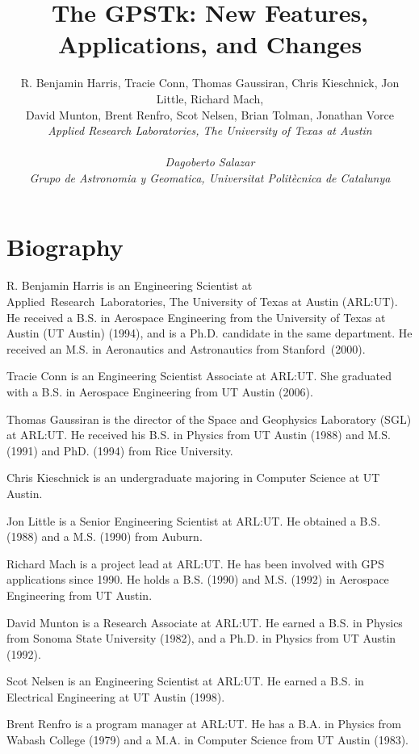 \documentclass[letterpaper,ugly,10pt]{ion-gps}
\title{\huge\bf The GPSTk: New Features, Applications, and Changes }
\author{ R. Benjamin Harris, Tracie Conn, Thomas Gaussiran, 
Chris Kieschnick, Jon Little, Richard Mach, \\
David Munton, Brent Renfro, Scot Nelsen, Brian Tolman, Jonathan Vorce \\
       \it{Applied Research Laboratories, The University of Texas at Austin} \\
	\\
	Dagoberto Salazar \\
	\it{Grupo de Astronomia y Geomatica, Universitat Polit\`{e}cnica de Catalunya} }
\date{}
\begin{document}
\def\figurename{Fig.}
\def\tablename{Table}

\pagestyle{plain} %

\maketitle



\section*{Biography}

R. Benjamin Harris is an Engineering Scientist at \mbox{Applied Research
Laboratories}, The University of Texas at Austin (ARL:UT). He received a B.S. in Aerospace Engineering from the University of Texas at Austin (UT Austin) (1994), and is a Ph.D. candidate in the same department. He received an M.S. in Aeronautics and Astronautics from \mbox{Stanford (2000)}.

Tracie Conn is an Engineering Scientist Associate at ARL:UT. She
graduated with a B.S. in Aerospace Engineering from UT Austin (2006).

Thomas Gaussiran is the director of the Space and Geophysics Laboratory
(SGL) at ARL:UT. He received his B.S. in Physics from UT Austin (1988)
and M.S. (1991) and PhD. (1994) from Rice University.

Chris Kieschnick is an undergraduate majoring in Computer Science at UT Austin.

Jon Little is a Senior Engineering Scientist at ARL:UT. He obtained a
B.S. (1988) and a M.S. (1990) from Auburn.

Richard Mach is a project lead at ARL:UT.  He has been involved with
GPS applications since 1990.  He holds a B.S. (1990) and M.S. (1992) in Aerospace
Engineering from UT Austin.

David Munton is a Research Associate at ARL:UT. He earned a B.S. in Physics from Sonoma State University (1982), and a Ph.D. in Physics from UT Austin (1992). 

Scot Nelsen is an Engineering Scientist at ARL:UT. He earned a B.S. in
Electrical Engineering at UT Austin (1998).

Brent Renfro is a program manager at ARL:UT.  He has a B.A. in Physics from Wabash College (1979) and a M.A. in Computer Science from UT Austin (1983).
\end{document}
